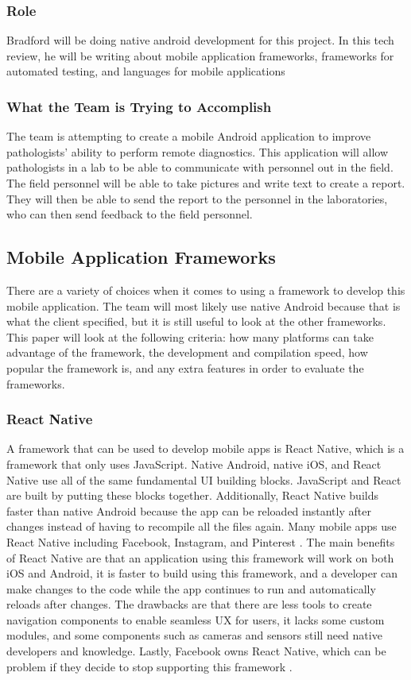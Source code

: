 \documentclass[onecolumn, draftclsnofoot,10pt, compsoc]{IEEEtran}
\begin{document}
 \subsubsection{Role}
 Bradford will be doing native android development for this project. In this tech review, he will be writing about mobile application frameworks, frameworks for automated testing, and languages for mobile applications
 \subsubsection{What the Team is Trying to Accomplish}
 The team is attempting to create a mobile Android application to improve pathologists' ability to perform remote diagnostics. This application will allow pathologists in a lab to be able to communicate with personnel out in the field. The field personnel will be able to take pictures and write text to create a report. They will then be able to send the report to the personnel in the laboratories, who can then send feedback to the field personnel.
 
\subsection{Mobile Application Frameworks}
There are a variety of choices when it comes to using a framework to develop this mobile application. The team will most likely use native Android because that is what the client specified, but it is still useful to look at the other frameworks. This paper will look at the following criteria: how many platforms can take advantage of the framework, the development and compilation speed, how popular the framework is, and any extra features in order to evaluate the frameworks.

\subsubsection{React Native}
A framework that can be used to develop mobile apps is React Native, which is a framework that only uses JavaScript. Native Android, native iOS, and React Native use all of the same fundamental UI building blocks. JavaScript and React are built by putting these blocks together. Additionally, React Native builds faster than native Android because the app can be reloaded instantly after changes instead of having to recompile all the files again. Many mobile apps use React Native including Facebook, Instagram, and Pinterest \cite{W-fb}. The main benefits of React Native are that an application using this framework will work on both iOS and Android, it is faster to build using this framework, and a developer can make changes to the code while the app continues to run and automatically reloads after changes. The drawbacks are that there are less tools to create navigation components to enable seamless UX for users, it lacks some custom modules, and some components such as cameras and sensors still need native developers and knowledge. Lastly, Facebook owns React Native, which can be problem if they decide to stop supporting this framework \cite{W-netguru}.
\end{document}
